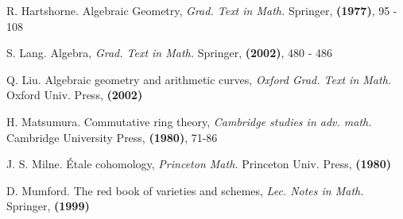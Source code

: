 \newpage

\begin{thebibliography}{10}

R. Hartshorne.
Algebraic Geometry, {\em Grad. Text in Math.}
Springer, \textbf{(1977)}, 95 - 108

S. Lang.
Algebra, {\em Grad. Text in Math.}
Springer, \textbf{(2002)}, 480 - 486

Q. Liu.
Algebraic geometry and arithmetic curves, {\em Oxford Grad. Text in Math.}
Oxford Univ. Press, \textbf{(2002)}

H. Matsumura.
Commutative ring theory, {\em Cambridge studies in adv. math.}
Cambridge University Press, \textbf{(1980)}, 71-86

J. S. Milne.
\'Etale cohomology, {\em Princeton Math.}
Princeton Univ. Press, \textbf{(1980)}

D. Mumford.
The red book of varieties and schemes, {\em Lec. Notes in Math.}
Springer, \textbf{(1999)}

\end{thebibliography}
